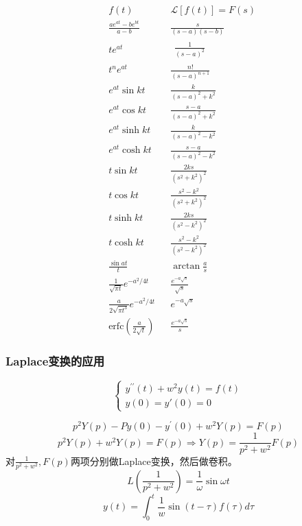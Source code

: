 \begin{multicols}{2}
        $$\begin{aligned}
            &f(t)&& \mathcal{L}[f(t)]=F(s)  \\
            &\frac{ae^{at}-be^{bt}}{a-b}&& \frac s{(s-a)(s-b)}  \\
            &te^{at}&& \begin{aligned}\frac{1}{(s-a)^2}\end{aligned}  \\
            &t^ne^{at}&& \frac{n!}{(s-a)^{n+1}}  \\
            &e^{at}\sin kt&& \frac k{(s-a)^2+k^2}  \\
            &e^{at}\cos kt&& \frac{s-a}{(s-a)^2+k^2}\\
            &e^{at}\sinh kt&& \frac k{(s-a)^2-k^2}  \\
            &e^{at}\cosh kt&& \frac{s-a}{(s-a)^2-k^2}  \\
            &t\sin kt&& \frac{2ks}{(s^2+k^2)^2}  \\
            &t\cos kt&& \frac{s^2-k^2}{(s^2+k^2)^2}  \\
            &t\sinh kt&& \frac{2ks}{(s^2-k^2)^2}  \\
            &t\cosh kt&& \frac{s^2-k^2}{(s^2-k^2)^2}  \\
            &\frac{\sin at}t&& \arctan\frac as  \\
            &\frac1{\sqrt{\pi t}}e^{-a^2/4t}&& \frac{e^{-a\sqrt s}}{\sqrt s}  \\
            &\frac a{2\sqrt{\pi t^3}}e^{-a^2/4t}&& e^{-a\sqrt{s}}  \\
            &\mathrm{erfc}\left(\frac a{2\sqrt{t}}\right)&& \frac{e^{-a\sqrt{s}}}s 
        \end{aligned}$$
    \end{multicols}



\subsubsection{Laplace变换的应用}
\begin{ex}
    $$\begin{cases}y^{\prime\prime}(t)+w^{2}y(t)=f(t)\\y(0)=y'(0)=0\end{cases}$$

    $$p^2Y(p)-Py(0)-y^{\prime}(0)+w^2Y(p)=F(p)$$
    $$p^{2}Y(p)+w^{2}Y(p)=F(p)\Rightarrow Y(p)=\frac{1}{p^{2}+w^{2}}F(p)$$
对$\frac{1}{p^{2}+w^{2}},F(p)$两项分别做Laplace变换，然后做卷积。
$$L\left(\frac{1}{p^{2}+w^{2}}\right)=\frac{1}{\omega}\sin \omega t$$
$$y(t)=\int_{0}^{t}\frac{1}{w}\sin(t-\tau)f(\tau)d\tau $$
\end{ex}

